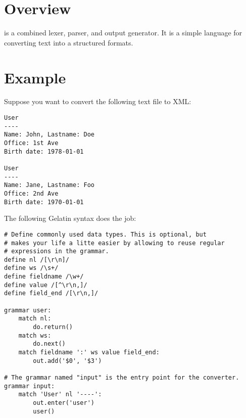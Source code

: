 

\newpage
\section{Overview}

\product is a combined lexer, parser, and output generator. It is a simple
language for converting text into a structured formats.

\section{Example}

Suppose you want to convert the following text file to XML:

\begin{lstlisting}
User
----
Name: John, Lastname: Doe
Office: 1st Ave
Birth date: 1978-01-01

User
----
Name: Jane, Lastname: Foo
Office: 2nd Ave
Birth date: 1970-01-01
\end{lstlisting}

The following Gelatin syntax does the job:

\begin{lstlisting}
# Define commonly used data types. This is optional, but
# makes your life a litte easier by allowing to reuse regular
# expressions in the grammar.
define nl /[\r\n]/
define ws /\s+/
define fieldname /\w+/
define value /[^\r\n,]/
define field_end /[\r\n,]/

grammar user:
    match nl:
        do.return()
    match ws:
        do.next()
    match fieldname ':' ws value field_end:
        out.add('$0', '$3')

# The grammar named "input" is the entry point for the converter.
grammar input:
    match 'User' nl '----':
        out.enter('user')
        user()
\end{lstlisting}

